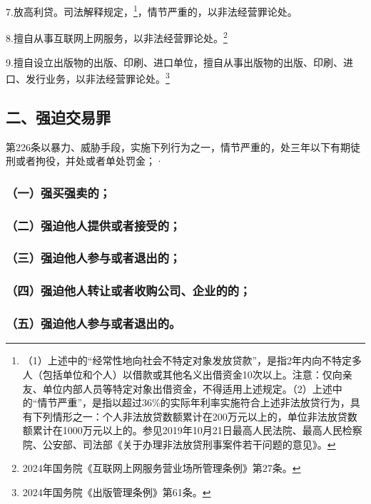7.放高利贷。司法解释规定，\footnote{（1）上述中的“经常性地向社会不特定对象发放贷款”，是指2年内向不特定多人（包括单位和个人）以借款或其他名义出借资金10次以上。注意：仅向亲友、单位内部人员等特定对象出借资金，不得适用上述规定。（2）上述中的“情节严重”，是指以超过36\%的实际年利率实施符合上述非法放贷行为，具有下列情形之一：个人非法放贷数额累计在200万元以上的，单位非法放贷数额累计在1000万元以上的。参见2019年10月21日最高人民法院、最高人民检察院、公安部、司法部《关于办理非法放贷刑事案件若干问题的意见》。}，情节严重的，以非法经营罪论处。

8.擅自从事互联网上网服务，以非法经营罪论处。\footnote{2024年国务院《互联网上网服务营业场所管理条例》第27条。}

9.擅自设立出版物的出版、印刷、进口单位，擅自从事出版物的出版、印刷、进口、发行业务，以非法经营罪论处。\footnote{2024年国务院《出版管理条例》第61条。}

\subsection*{二、强迫交易罪}

第226条以暴力、威胁手段，实施下列行为之一，情节严重的，处三年以下有期徒刑或者拘役，并处或者单处罚金；·

\subsubsection*{（一）强买强卖的；}

\subsubsection*{（二）强迫他人提供或者接受的；}

\subsubsection*{（三）强迫他人参与或者退出的；}

\subsubsection*{（四）强迫他人转让或者收购公司、企业的的；}

\subsubsection*{（五）强迫他人参与或者退出的。}

